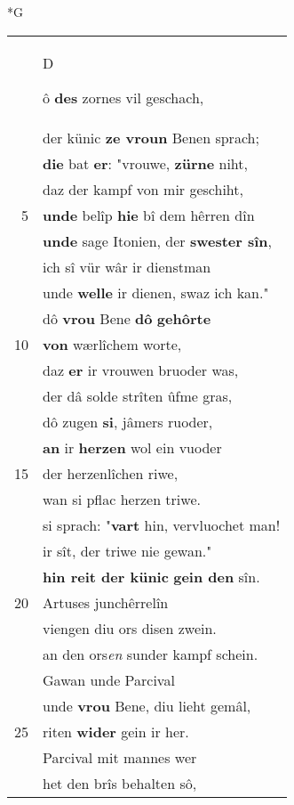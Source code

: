 \documentclass[8pt,a4paper,notitlepage]{article}
\begin{document}
\begin{table}[ht]
\begin{minipage}[t]{0.5\linewidth}
\small
\begin{center}*G
\end{center}
\begin{tabular}{rl}
 & \begin{large}D\end{large}ô \textbf{des} zornes vil geschach,\\ 
 & der künic \textbf{ze vroun} Benen sprach;\\ 
 & \textbf{die} bat \textbf{er}: "vrouwe, \textbf{zürne} niht,\\ 
 & daz der kampf von mir geschiht,\\ 
5 & \textbf{unde} belîp \textbf{hie} bî dem hêrren dîn\\ 
 & \textbf{unde} sage Itonien, der \textbf{swester sîn},\\ 
 & ich sî vür wâr ir dienstman\\ 
 & unde \textbf{welle} ir dienen, swaz ich kan."\\ 
 & dô \textbf{vrou} Bene \textbf{dô} \textbf{gehôrte}\\ 
10 & \textbf{von} wærlîchem worte,\\ 
 & daz \textbf{er} ir vrouwen bruoder was,\\ 
 & der dâ solde strîten ûfme gras,\\ 
 & dô zugen \textbf{si}, jâmers ruoder,\\ 
 & \textbf{an} ir \textbf{herzen} wol ein vuoder\\ 
15 & der herzenlîchen riwe,\\ 
 & wan si pflac herzen triwe.\\ 
 & si sprach: "\textbf{vart} hin, vervluochet man!\\ 
 & ir sît, der triwe nie gewan."\\ 
 & \textbf{hin reit der künic} \textbf{gein den} sîn.\\ 
20 & Artuses junchêrrelîn\\ 
 & viengen diu ors disen zwein.\\ 
 & an den ors\textit{en} sunder kampf schein.\\ 
 & Gawan unde Parcival\\ 
 & unde \textbf{vrou} Bene, diu lieht gemâl,\\ 
25 & riten \textbf{wider} gein ir her.\\ 
 & Parcival mit mannes wer\\ 
 & het den brîs behalten sô,\\ 

\end{tabular}
\end{minipage}
\end{table}
\end{document}
